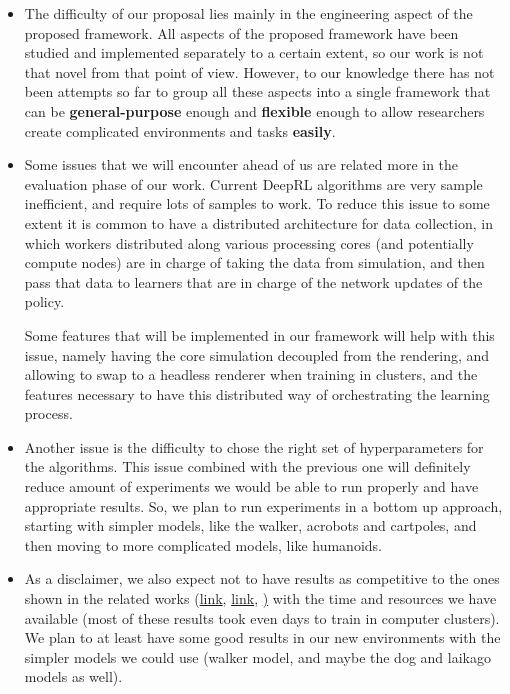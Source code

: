 \begin{itemize}
    \item The difficulty of our proposal lies mainly in the engineering aspect
          of the proposed framework. All aspects of the proposed framework have
          been studied and implemented separately to a certain extent, so our work 
          is not that novel from that point of view. However, to our knowledge there
          has not been attempts so far to group all these aspects into a single
          framework that can be \textbf{general-purpose} enough and \textbf{flexible} 
          enough to allow researchers create complicated environments and tasks
          \textbf{easily}.

    \item Some issues that we will encounter ahead of us are related more in the
          evaluation phase of our work. Current DeepRL algorithms are very sample
          inefficient, and require lots of samples to work. To reduce this issue
          to some extent it is common to have a distributed architecture for data
          collection, in which workers distributed along various processing cores
          (and potentially compute nodes) are in charge of taking the data from
          simulation, and then pass that data to learners that are in charge
          of the network updates of the policy. 

          Some features that will be implemented in our framework will help with
          this issue, namely having the core simulation decoupled from the rendering,
          and allowing to swap to a headless renderer when training in clusters, and
          the features necessary to have this distributed way of orchestrating the
          learning process.

    \item Another issue is the difficulty to chose the right set of hyperparameters
          for the algorithms. This issue combined with the previous one will definitely
          reduce amount of experiments we would be able to run properly and have
          appropriate results. So, we plan to run experiments in a bottom up approach,
          starting with simpler models, like the walker, acrobots and cartpoles,
          and then moving to more complicated models, like humanoids.

    \item As a disclaimer, we also expect not to have results as competitive to
          the ones shown in the related works (\href{https://youtu.be/KPfzRSBzNX4}{link}, 
          \href{https://youtu.be/hx_bgoTF7bs}{link}, \href{https://youtu.be/hd1yvLWm6oA}) 
          with the time and resources we have available (most of these results took
          even days to train in computer clusters). We plan to at least have
          some good results in our new environments with the simpler models we could
          use (walker model, and maybe the dog and laikago models as well).


\end{itemize}
